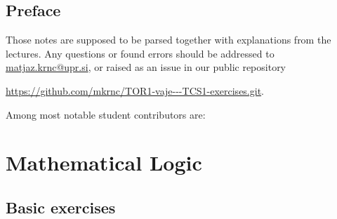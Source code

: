 \documentclass[11pt,paper=b5,footinclude,headinclude]{scrbook} %
\theoremstyle{remark}
\theoremstyle{definition} %
\theoremstyle{theorem} %
\newcommand{\myRepo}{\url{https://github.com/mkrnc/TOR1-vaje---TCS1-exercises.git}}
\begin{document}


\newpage
\section*{Preface}
   

Those notes are supposed to be parsed together with explanations from the lectures.
Any questions or found errors should be 
addressed to \url{matjaz.krnc@upr.si}, or 
raised as an issue in our public repository 
\begin{center}
    \myRepo.    
\end{center}


Among most notable student contributors are:




\tableofcontents


\chapter{Mathematical Logic}


\section{Basic exercises}
\end{document}
